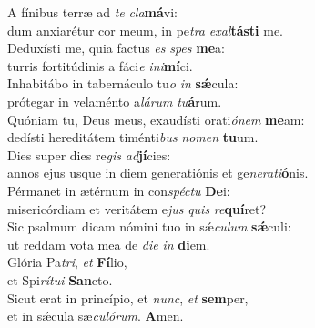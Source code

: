 \evenverse A fínibus terræ ad \textit{te} \textit{cla}\textbf{má}vi:~\*\\
\evenverse dum anxiarétur cor meum, in pe\textit{tra} \textit{e}\textit{xal}\textbf{tá}\textbf{sti} me.\\
\oddverse Deduxísti me, quia factus \textit{es} \textit{spes} \textbf{me}a:~\*\\
\oddverse turris fortitúdinis a fáci\textit{e} \textit{i}\textit{ni}\textbf{mí}ci.\\
\evenverse Inhabitábo in tabernáculo tu\textit{o} \textit{in} \textbf{sǽ}cula:~\*\\
\evenverse prótegar in velaménto a\textit{lá}\textit{rum} \textit{tu}\textbf{á}rum.\\
\oddverse Quóniam tu, Deus meus, exaudísti orati\textit{ó}\textit{nem} \textbf{me}am:~\*\\
\oddverse dedísti hereditátem timénti\textit{bus} \textit{no}\textit{men} \textbf{tu}um.\\
\evenverse Dies super dies re\textit{gis} \textit{ad}\textbf{jí}cies:~\*\\
\evenverse annos ejus usque in diem generatiónis et ge\textit{ne}\textit{ra}\textit{ti}\textbf{ó}nis.\\
\oddverse Pérmanet in ætérnum in con\textit{spé}\textit{ctu} \textbf{De}i:~\*\\
\oddverse misericórdiam et veritátem e\textit{jus} \textit{quis} \textit{re}\textbf{quí}ret?\\
\evenverse Sic psalmum dicam nómini tuo in sǽ\textit{cu}\textit{lum} \textbf{sǽ}culi:~\*\\
\evenverse ut reddam vota mea de \textit{di}\textit{e} \textit{in} \textbf{di}em.\\
\oddverse Glória Pa\textit{tri}, \textit{et} \textbf{Fí}lio,~\*\\
\oddverse et Spi\textit{rí}\textit{tu}\textit{i} \textbf{San}cto.\\
\evenverse Sicut erat in princípio, et \textit{nunc}, \textit{et} \textbf{sem}per,~\*\\
\evenverse et in sǽcula sæ\textit{cu}\textit{ló}\textit{rum}. \textbf{A}men.\\
